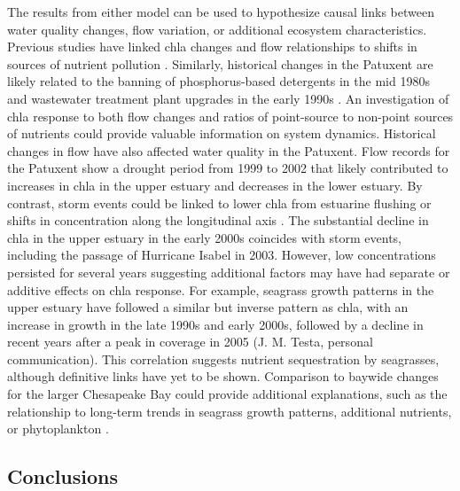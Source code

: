 \documentclass{svjour3}\usepackage[]{graphicx}\usepackage[]{color}
\begin{document}
The results from either model can be used to hypothesize causal links between water quality changes, flow variation, or additional ecosystem characteristics.  Previous studies have linked \ac{chla} changes and flow relationships to shifts in sources of nutrient pollution \cite{Hirsch10,Beck15}.  Similarly, historical changes in the Patuxent are likely related to the banning of phosphorus-based detergents in the mid 1980s and wastewater treatment plant upgrades in the early 1990s \cite{Lung03,Testa08a}.  An investigation of \ac{chla} response to both flow changes and ratios of point-source to non-point sources of nutrients could provide valuable information on system dynamics.  Historical changes in flow have also affected water quality in the Patuxent.  Flow records for the Patuxent show a drought period from 1999 to 2002 that likely contributed to increases in \ac{chla} in the upper estuary and decreases in the lower estuary.  By contrast, storm events could be linked to lower \ac{chla} from estuarine flushing or shifts in concentration along the longitudinal axis \cite{Hagy06,Murrell07}.  The substantial decline in \ac{chla} in the upper estuary in the early 2000s coincides with storm events, including the passage of Hurricane Isabel in 2003.  However, low concentrations persisted for several years suggesting additional factors may have had separate or additive effects on \ac{chla} response.  For example, seagrass growth patterns in the upper estuary have followed a similar but inverse pattern as \ac{chla}, with an increase in growth in the late 1990s and early 2000s, followed by a decline in recent years after a peak in coverage in 2005 (J. M. Testa, personal communication).  This correlation suggests nutrient sequestration by seagrasses, although definitive links have yet to be shown.  Comparison to baywide changes for the larger Chesapeake Bay could provide additional explanations, such as the relationship to long-term trends in seagrass growth patterns, additional nutrients, or phytoplankton \cite{Orth10,Harding15}.    

\subsection{Conclusions}
\end{document}
